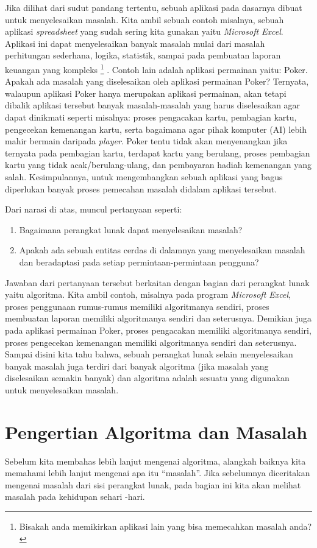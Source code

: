 Jika dilihat dari sudut pandang tertentu, sebuah aplikasi pada dasarnya dibuat untuk menyelesaikan masalah. Kita ambil sebuah contoh misalnya, sebuah aplikasi \textit{spreadsheet} yang sudah sering kita gunakan yaitu \textit{Microsoft Excel}. Aplikasi ini dapat menyelesaikan banyak masalah mulai dari masalah perhitungan sederhana, logika, statistik, sampai pada pembuatan laporan keuangan yang kompleks \footnote{Bisakah anda memikirkan aplikasi lain yang bisa memecahkan masalah anda?}
. Contoh lain adalah aplikasi permainan yaitu: Poker. Apakah ada masalah yang diselesaikan oleh aplikasi permainan Poker? Ternyata, walaupun aplikasi Poker hanya merupakan aplikasi permainan, akan tetapi dibalik aplikasi tersebut banyak masalah-masalah yang harus diselesaikan agar dapat dinikmati seperti misalnya: proses pengacakan kartu, pembagian kartu, pengecekan kemenangan kartu, serta bagaimana agar pihak komputer (AI) lebih mahir bermain daripada \textit{player}. Poker tentu tidak akan menyenangkan jika ternyata pada pembagian kartu, terdapat kartu yang berulang, proses pembagian kartu yang tidak acak/berulang-ulang, dan pembayaran hadiah kemenangan yang salah. Kesimpulannya, untuk mengembangkan sebuah aplikasi yang bagus diperlukan banyak proses pemecahan masalah didalam aplikasi tersebut.

Dari narasi di atas, muncul pertanyaan seperti:
\begin{enumerate}
	\item Bagaimana perangkat lunak dapat menyelesaikan masalah?
	\item Apakah ada sebuah entitas cerdas di dalamnya yang menyelesaikan masalah dan beradaptasi pada setiap permintaan-permintaan pengguna?
\end{enumerate}
  
Jawaban dari pertanyaan tersebut berkaitan dengan bagian dari perangkat lunak yaitu algoritma. Kita ambil contoh, misalnya pada program \textit{Microsoft Excel}, proses penggunaan rumus-rumus memiliki algoritmanya sendiri, proses membuatan laporan memiliki algoritmanya sendiri dan seterusnya. Demikian juga pada aplikasi permainan Poker, proses pengacakan memiliki algoritmanya sendiri, proses pengecekan kemenangan memiliki algoritmanya sendiri dan seterusnya. Sampai disini kita tahu bahwa, sebuah perangkat lunak selain menyelesaikan banyak masalah juga terdiri dari banyak algoritma (jika masalah yang diselesaikan semakin banyak) dan algoritma adalah sesuatu yang digunakan untuk menyelesaikan masalah.


\section{Pengertian Algoritma dan Masalah}
Sebelum kita membahas lebih lanjut mengenai algoritma, alangkah baiknya kita memahami lebih lanjut mengenai apa itu ``masalah''. Jika sebelumnya diceritakan mengenai masalah dari sisi perangkat lunak, pada bagian ini kita akan melihat masalah pada kehidupan sehari -hari. 

